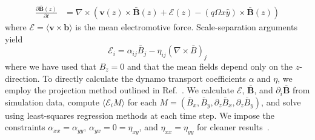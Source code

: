 \documentclass{epsconf}
\newcommand{\bb}[1]{\textbf{#1}}
\begin{document}
\begin{align*}
    \frac{\partial\bar{\bb{B}}(z)}{\partial t}&=\nabla\times\left(\bb{v}(z)\times\bar{\bb{B}}(z)+\mathcal{E}(z)-(q\Omega x\hat y)\times\bar{\bb{B}}(z)\right)
\end{align*}
where $\mathcal{E}=\langle \bb{v}\times\bb{b}\rangle$ is the mean electromotive force. Scale-separation arguments yield
\begin{equation*}
    \mathcal{E}_i = \alpha_{ij}\bar{B}_j-\eta_{ij}(\nabla\times\bar{B})_j
\end{equation*}
where we have used that $B_z = 0$ and that the mean fields depend only on the $z$-direction. To directly calculate the dynamo transport coefficients $\alpha$ and $\eta$, we employ the projection method outlined in Ref.~\cite{SB16}. We calculate $\mathcal{E}$, $\bar{\bb{B}}$, and $\partial_i\bar{\bb{B}}$ from simulation data, compute $\langle\mathcal{E}_iM\rangle$ for each $M=(\bar B_x, \bar B_y, \partial_z\bar B_x, \partial_z\bar B_y)$, and solve using least-squares regression methods at each time step. We impose the constraints $\alpha_{xx}=\alpha_{yy}$, $\alpha_{yx}=0=\eta_{xy}$, and $\eta_{xx}=\eta_{yy}$ for cleaner results~\cite{SB16}. \\
\end{document}
